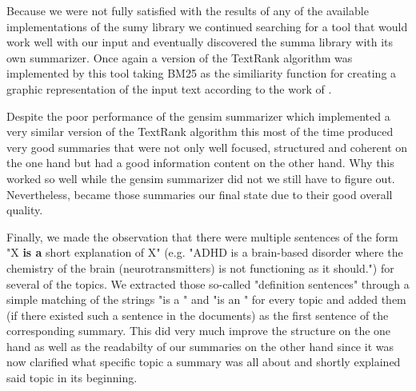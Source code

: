 Because we were not fully satisfied with the results of any of the available implementations of the sumy library we continued searching for a tool that would work well with our input and eventually discovered the summa library with its own summarizer. Once again a version of the TextRank algorithm was implemented by this tool taking BM25 as the similiarity function for creating a graphic representation of the input text according to the work of \citet{DBLP:journals/corr/BarriosLAW16}. 

Despite the poor performance of the gensim summarizer which implemented a very similar version of the TextRank algorithm this most of the time produced very good summaries that were not only well focused, structured and coherent on the one hand but had a good information content on the other hand. Why this worked so well while the gensim summarizer did not we still have to figure out. Nevertheless, became those summaries our final state due to their good overall quality.  
 
Finally, we made the observation that there were multiple sentences of the form "X \textbf{is a} short explanation of X" (e.g. "ADHD is a brain-based disorder where the chemistry of the brain (neurotransmitters) is not functioning as it should.") for several of the topics. We extracted those so-called "definition sentences" through a simple matching of the strings "is a " and "is an " for every topic and added them (if there existed such a sentence in the documents) as the first sentence of the corresponding summary. This did very much improve the structure on the one hand as well as the readabilty of our summaries on the other hand since it was now clarified what specific topic a summary was all about and shortly explained said topic in its beginning.
